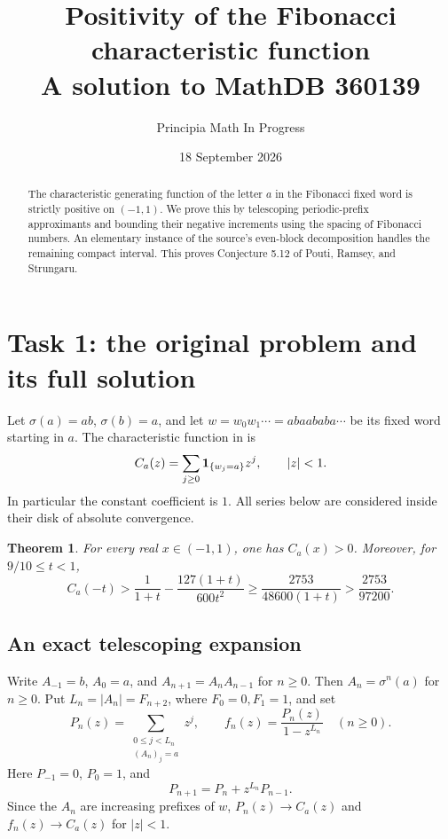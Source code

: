 \documentclass[11pt]{article}
\title{Positivity of the Fibonacci characteristic function\\
\large A solution to MathDB 360139}
\author{Principia Math In Progress}
\date{18 September 2026}
\newtheorem{theorem}{Theorem}
\begin{document}
\maketitle
\begin{abstract}
The characteristic generating function of the letter $a$ in the
Fibonacci fixed word is strictly positive on $(-1,1)$. We prove this
by telescoping periodic-prefix approximants and bounding their negative
increments using the spacing of Fibonacci numbers. An elementary
instance of the source's even-block decomposition handles the remaining
compact interval. This proves Conjecture 5.12 of Pouti, Ramsey, and
Strungaru.
\end{abstract}

\section*{Task 1: the original problem and its full solution}
Let $\sigma(a)=ab$, $\sigma(b)=a$, and let
$w=w_0w_1\cdots=abaababa\cdots$ be its fixed word starting in $a$.
The characteristic function in \cite[Sections 3--5]{PRS} is
\[
 C_a(z)=\sum_{j\geq0}{\bf1}_{\{w_j=a\}}z^j,\qquad |z|<1.
\]
In particular the constant coefficient is $1$. All series below
are considered inside their disk of absolute convergence.

\begin{theorem}\label{thm:main}
For every real $x\in(-1,1)$, one has $C_a(x)>0$.
Moreover, for $9/10\leq t<1$,
\[
 C_a(-t)>\frac{1}{1+t}-\frac{127(1+t)}{600t^2}
 \geq\frac{2753}{48600(1+t)}>\frac{2753}{97200}.
\]
\end{theorem}

\subsection*{An exact telescoping expansion}
Write $A_{-1}=b$, $A_0=a$, and $A_{n+1}=A_nA_{n-1}$ for $n\geq0$.
Then $A_n=\sigma^n(a)$ for $n\geq0$. Put
$L_n=|A_n|=F_{n+2}$, where $F_0=0,F_1=1$, and set
\[
 P_n(z)=\sum_{\substack{0\leq j<L_n\\(A_n)_j=a}}z^j,
 \qquad f_n(z)=\frac{P_n(z)}{1-z^{L_n}}\quad(n\geq0).
\]
Here $P_{-1}=0$, $P_0=1$, and
\begin{equation}\label{eq:rec}
 P_{n+1}=P_n+z^{L_n}P_{n-1}.
\end{equation}
Since the $A_n$ are increasing prefixes of $w$,
$P_n(z)\to C_a(z)$ and $f_n(z)\to C_a(z)$ for $|z|<1$.
\end{document}
